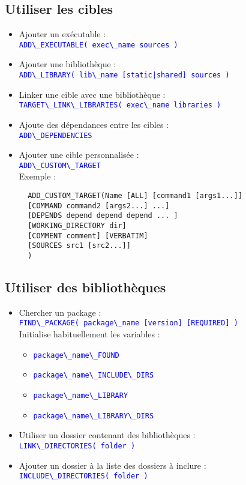 \documentclass[a4paper,oneside]{article}
\begin{document}
\subsection{Utiliser les cibles}
\begin{itemize}
\item Ajouter un exécutable :\\
  \textcolor{blue}{\verb?ADD\_EXECUTABLE( exec\_name sources )?}
\item Ajouter une bibliothèque :\\
  \textcolor{blue}{\verb?ADD\_LIBRARY( lib\_name [static|shared] sources )?}
\item Linker une cible avec une bibliothèque :\\
  \textcolor{blue}{\verb?TARGET\_LINK\_LIBRARIES( exec\_name libraries )?}%
\item Ajoute des dépendances entre les cibles :\\
  \textcolor{blue}{\verb?ADD\_DEPENDENCIES ?}
\item Ajouter une cible personnalisée :\\
  \textcolor{blue}{\verb?ADD\_CUSTOM\_TARGET ?}\\
  Exemple :
\begin{verbatim}
  ADD_CUSTOM_TARGET(Name [ALL] [command1 [args1...]]
  [COMMAND command2 [args2...] ...]
  [DEPENDS depend depend depend ... ]
  [WORKING_DIRECTORY dir]
  [COMMENT comment] [VERBATIM]
  [SOURCES src1 [src2...]]
  )
\end{verbatim}
\end{itemize}

\subsection{Utiliser des bibliothèques}
\begin{itemize}
\item Chercher un package :\\
  \textcolor{blue}{\verb?FIND\_PACKAGE( package\_name [version] [REQUIRED] ) ?}\\
  Initialise habituellement les variables :
  \begin{itemize}
  \item \textcolor{blue}{\verb?package\_name\_FOUND ?}
  \item \textcolor{blue}{\verb?package\_name\_INCLUDE\_DIRS ?}
  \item \textcolor{blue}{\verb?package\_name\_LIBRARY ?}
  \item \textcolor{blue}{\verb?package\_name\_LIBRARY\_DIRS ?}
  \end{itemize}
\item Utiliser un dossier contenant des bibliothèques :\\
  \textcolor{blue}{\verb?LINK\_DIRECTORIES( folder )?}
\item Ajouter un dossier à la liste des dossiers à inclure :\\
  \textcolor{blue}{\verb?INCLUDE\_DIRECTORIES( folder ) ?}
\end{itemize}
\end{document}
